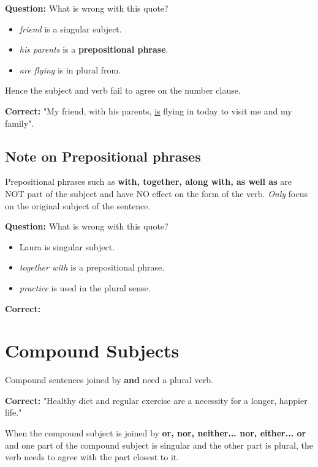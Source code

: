 \documentclass[12pt]{article} %
\begin{document}
\textbf{Question:} What is wrong with this quote?
\begin{itemize}
  \item \textit{friend} is a singular subject.
  \item \textit{his parents} is a \textbf{prepositional phrase}.
  \item \textit{are flying} is in plural from.
\end{itemize}
Hence the subject and verb fail to agree on the number clause.

\textbf{Correct:} "My friend, with his parents, \underline{is} flying in today to visit me and my family".

\subsection*{Note on Prepositional phrases}

Prepositional phrases such as \textbf{with, together, along with, as well as} are NOT part of the subject and have NO
effect on the form of the verb. \textit{Only} focus on the original subject of the sentence. 


\textbf{Question:} What is wrong with this quote?
\begin{itemize}
  \item Laura is singular subject.
  \item \textit{together with} is a prepositional phrase. 
  \item \textit{practice} is used in the plural sense.
\end{itemize}

\textbf{Correct:} 

\newpage

\section{Compound Subjects}

Compound sentences joined by \textbf{and} need a plural verb.

\textbf{Correct:} "Healthy diet and regular exercise are a necessity for a longer, happier life."

When the compound subject is joined by \textbf{or, nor, neither... nor, either... or}
and one part of the compound subject is singular and the other part is plural,
the verb needs to agree with the part closest to it.
\end{document}
